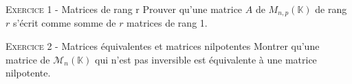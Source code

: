 \documentclass[11pt]{article}
\begin{document}
 

\begin{center}\textsc{{\huge }}\end{center}



\vskip0.3cm\noindent\textsc{Exercice 1} - Matrices de rang r
\vskip0.2cm
Prouver qu'une matrice $A$ de $M_{n,p}(\mathbb K)$ de rang $r$ s'écrit comme somme de $r$ matrices de rang 1.




\vskip0.3cm\noindent\textsc{Exercice 2} - Matrices équivalentes et matrices nilpotentes
\vskip0.2cm
Montrer qu'une matrice de $\mathcal M_n(\mathbb K)$ qui n'est pas inversible est
équivalente à une matrice nilpotente.




\vskip0.5cm

\end{document}
